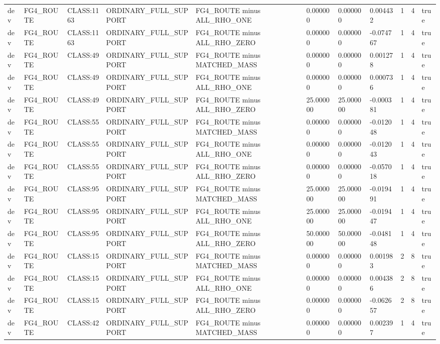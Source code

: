 \begin{tabular}{lllllllllll}
dev & FG4\_ROUTE & CLASS:1163 & ORDINARY\_FULL\_SUPPORT & FG4\_ROUTE minus ALL\_RHO\_ONE & 0.000000 & 0.000000 & 0.004432 & 1 & 4 & true \\
dev & FG4\_ROUTE & CLASS:1163 & ORDINARY\_FULL\_SUPPORT & FG4\_ROUTE minus ALL\_RHO\_ZERO & 0.000000 & 0.000000 & -0.074767 & 1 & 4 & true \\
dev & FG4\_ROUTE & CLASS:49 & ORDINARY\_FULL\_SUPPORT & FG4\_ROUTE minus MATCHED\_MASS & 0.000000 & 0.000000 & 0.001278 & 1 & 4 & true \\
dev & FG4\_ROUTE & CLASS:49 & ORDINARY\_FULL\_SUPPORT & FG4\_ROUTE minus ALL\_RHO\_ONE & 0.000000 & 0.000000 & 0.000736 & 1 & 4 & true \\
dev & FG4\_ROUTE & CLASS:49 & ORDINARY\_FULL\_SUPPORT & FG4\_ROUTE minus ALL\_RHO\_ZERO & 25.000000 & 25.000000 & -0.000381 & 1 & 4 & true \\
dev & FG4\_ROUTE & CLASS:55 & ORDINARY\_FULL\_SUPPORT & FG4\_ROUTE minus MATCHED\_MASS & 0.000000 & 0.000000 & -0.012048 & 1 & 4 & true \\
dev & FG4\_ROUTE & CLASS:55 & ORDINARY\_FULL\_SUPPORT & FG4\_ROUTE minus ALL\_RHO\_ONE & 0.000000 & 0.000000 & -0.012043 & 1 & 4 & true \\
dev & FG4\_ROUTE & CLASS:55 & ORDINARY\_FULL\_SUPPORT & FG4\_ROUTE minus ALL\_RHO\_ZERO & 0.000000 & 0.000000 & -0.057018 & 1 & 4 & true \\
dev & FG4\_ROUTE & CLASS:95 & ORDINARY\_FULL\_SUPPORT & FG4\_ROUTE minus MATCHED\_MASS & 25.000000 & 25.000000 & -0.019491 & 1 & 4 & true \\
dev & FG4\_ROUTE & CLASS:95 & ORDINARY\_FULL\_SUPPORT & FG4\_ROUTE minus ALL\_RHO\_ONE & 25.000000 & 25.000000 & -0.019447 & 1 & 4 & true \\
dev & FG4\_ROUTE & CLASS:95 & ORDINARY\_FULL\_SUPPORT & FG4\_ROUTE minus ALL\_RHO\_ZERO & 50.000000 & 50.000000 & -0.048148 & 1 & 4 & true \\
dev & FG4\_ROUTE & CLASS:15 & ORDINARY\_FULL\_SUPPORT & FG4\_ROUTE minus MATCHED\_MASS & 0.000000 & 0.000000 & 0.001983 & 2 & 8 & true \\
dev & FG4\_ROUTE & CLASS:15 & ORDINARY\_FULL\_SUPPORT & FG4\_ROUTE minus ALL\_RHO\_ONE & 0.000000 & 0.000000 & 0.004386 & 2 & 8 & true \\
dev & FG4\_ROUTE & CLASS:15 & ORDINARY\_FULL\_SUPPORT & FG4\_ROUTE minus ALL\_RHO\_ZERO & 0.000000 & 0.000000 & -0.062657 & 2 & 8 & true \\
dev & FG4\_ROUTE & CLASS:42 & ORDINARY\_FULL\_SUPPORT & FG4\_ROUTE minus MATCHED\_MASS & 0.000000 & 0.000000 & 0.002397 & 1 & 4 & true \\

\end{tabular}
